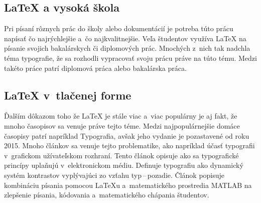 \documentclass[a4paper,11pt]{article}
\begin{document}
\subsection{{\LaTeX} a vysoká škola}
Pri písaní rôznych prác do školy alebo dokumentácií je potreba túto prácu napísať čo najrýchlejšie a~čo najkvalitnejšie.
Veľa študentov využíva {\LaTeX} na písanie svojich bakalárskych či diplomových prác. Mnochých z~nich tak nadchla téma typografie, že sa rozhodli vypracovať svoju prácu práve na túto tému. Medzi takéto práce patrí diplomová práca\cite{Cerny2010} alebo bakalárska práca\cite{Simek2009}.

\subsection{{\LaTeX} v~tlačenej forme}
Ďalším dôkazom toho že {\LaTeX} je stále viac a~viac populárny je aj fakt, že mnoho časopisov sa venuje práve tejto téme. Medzi najpopulárnejšie domáce časopisy patrí napríklad Typografia\cite{TypografiaCz}, avšak jeho vydanie je pozastavené od roku 2015.
Mnoho článkov sa venuje tejto problematike, ako napríklad účasť typografii v~grafickom užívateľskom rozhraní\cite{Kahn1998}. Tento článok opisuje ako sa typografické princípy uplaňujú v~elektronickom médiu. Definuje typografiu ako dynamický systém kontrastov vyplývajúci zo vzťahu typ\,--\,pozadie. Článok\cite{Sullivan2016} popisuje kombináciu písania pomocou {\LaTeX}u a~matematického prostredia MATLAB na zlepšenie písania, kódovania a~matematického chápania študentov.

\newpage

\renewcommand{\refname}{Literatúra}

\end{document}
